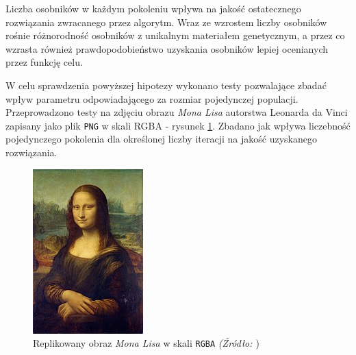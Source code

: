 \begin{hypothesis}
Liczba osobników w każdym pokoleniu wpływa na jakość ostatecznego rozwiązania zwracanego przez algorytm. Wraz ze wzrostem liczby osobników rośnie różnorodność osobników z unikalnym materiałem genetycznym, a przez co wzrasta również prawdopodobieństwo uzyskania osobników lepiej ocenianych przez funkcję celu.
\end{hypothesis}

W celu sprawdzenia powyższej hipotezy wykonano testy pozwalające zbadać wpływ parametru odpowiadającego za rozmiar pojedynczej populacji. Przeprowadzono testy na zdjęciu obrazu \textit{Mona Lisa} autorstwa Leonarda da Vinci zapisany jako plik \texttt{PNG} w skali RGBA - rysunek \ref{fig:mona_rgba}. Zbadano jak wpływa liczebność pojedynczego pokolenia dla określonej liczby iteracji na jakość uzyskanego rozwiązania.

\begin{figure}[!htb]
    \centering
    \includegraphics{images/mona/mona.jpg}
    \caption{
        Replikowany obraz \textit{Mona Lisa} w skali \texttt{RGBA}
        \textit{(Źródło: \cite{MonaLisa}})
    }
    \label{fig:mona_rgba}
\end{figure}

